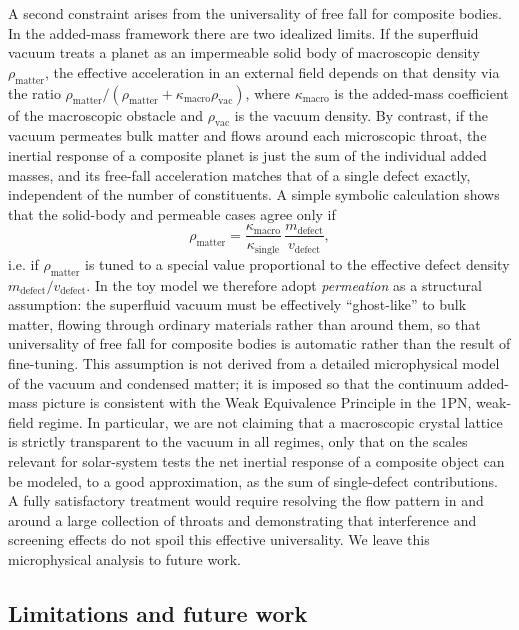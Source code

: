 \documentclass[11pt]{article}
\begin{document}
A second constraint arises from the universality of free fall for composite
bodies.
In the added-mass framework there are two idealized limits.
If the superfluid vacuum treats a planet as an impermeable solid body of
macroscopic density $\rho_{\mathrm{matter}}$, the effective acceleration in
an external field depends on that density via the ratio
$\rho_{\mathrm{matter}} / (\rho_{\mathrm{matter}} + \kappa_{\mathrm{macro}}\rho_{\mathrm{vac}})$,
where $\kappa_{\mathrm{macro}}$ is the added-mass coefficient of the
macroscopic obstacle and $\rho_{\mathrm{vac}}$ is the vacuum density.
By contrast, if the vacuum permeates bulk matter and flows around each
microscopic throat, the inertial response of a composite planet is just the
sum of the individual added masses, and its free-fall acceleration matches
that of a single defect exactly, independent of the number of constituents.
A simple symbolic calculation shows that the solid-body and permeable
cases agree only if
\begin{equation}
  \rho_{\mathrm{matter}}
  = \frac{\kappa_{\mathrm{macro}}}{\kappa_{\mathrm{single}}}\,
    \frac{m_{\mathrm{defect}}}{v_{\mathrm{defect}}},
\end{equation}
i.e. if $\rho_{\mathrm{matter}}$ is tuned to a special value proportional
to the effective defect density $m_{\mathrm{defect}}/v_{\mathrm{defect}}$.
In the toy model we therefore adopt \emph{permeation} as a structural
assumption: the superfluid vacuum must be effectively ``ghost-like'' to
bulk matter, flowing through ordinary materials rather than around them, so
that universality of free fall for composite bodies is automatic rather
than the result of fine-tuning.
This assumption is not derived from a detailed microphysical model of the
vacuum and condensed matter; it is imposed so that the continuum
added-mass picture is consistent with the Weak Equivalence Principle in
the 1PN, weak-field regime.
In particular, we are not claiming that a macroscopic crystal lattice is
strictly transparent to the vacuum in all regimes, only that on the scales
relevant for solar-system tests the net inertial response of a composite
object can be modeled, to a good approximation, as the sum of
single-defect contributions.
A fully satisfactory treatment would require resolving the flow pattern in
and around a large collection of throats and demonstrating that
interference and screening effects do not spoil this effective universality.
We leave this microphysical analysis to future work.


\subsection{Limitations and future work}
\label{subsec:discussion-future}
\end{document}
